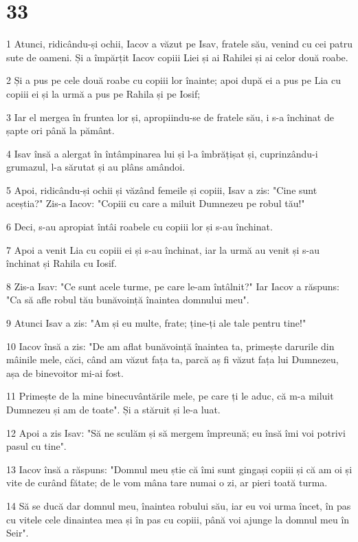 \chapter{33}

\par 1 Atunci, ridicându-și ochii, Iacov a văzut pe Isav, fratele său, venind cu cei patru sute de oameni. Și a împărțit Iacov copiii Liei și ai Rahilei și ai celor două roabe.
\par 2 Și a pus pe cele două roabe cu copiii lor înainte; apoi după ei a pus pe Lia cu copiii ei și la urmă a pus pe Rahila și pe Iosif;
\par 3 Iar el mergea în fruntea lor și, apropiindu-se de fratele său, i s-a închinat de șapte ori până la pământ.
\par 4 Isav însă a alergat în întâmpinarea lui și l-a îmbrățișat și, cuprinzându-i grumazul, l-a sărutat și au plâns amândoi.
\par 5 Apoi, ridicându-și ochii și văzând femeile și copiii, Isav a zis: "Cine sunt aceștia?" Zis-a Iacov: "Copiii cu care a miluit Dumnezeu pe robul tău!"
\par 6 Deci, s-au apropiat întâi roabele cu copiii lor și s-au închinat.
\par 7 Apoi a venit Lia cu copiii ei și s-au închinat, iar la urmă au venit și s-au închinat și Rahila cu Iosif.
\par 8 Zis-a Isav: "Ce sunt acele turme, pe care le-am întâlnit?" Iar Iacov a răspuns: "Ca să afle robul tău bunăvoință înaintea domnului meu".
\par 9 Atunci Isav a zis: "Am și eu multe, frate; ține-ți ale tale pentru tine!"
\par 10 Iacov însă a zis: "De am aflat bunăvoință înaintea ta, primește darurile din mâinile mele, căci, când am văzut fața ta, parcă aș fi văzut fața lui Dumnezeu, așa de binevoitor mi-ai fost.
\par 11 Primește de la mine binecuvântările mele, pe care ți le aduc, că m-a miluit Dumnezeu și am de toate". Și a stăruit și le-a luat.
\par 12 Apoi a zis Isav: "Să ne sculăm și să mergem împreună; eu însă îmi voi potrivi pasul cu tine".
\par 13 Iacov însă a răspuns: "Domnul meu știe că îmi sunt gingași copiii și că am oi și vite de curând fătate; de le vom mâna tare numai o zi, ar pieri toată turma.
\par 14 Să se ducă dar domnul meu, înaintea robului său, iar eu voi urma încet, în pas cu vitele cele dinaintea mea și în pas cu copiii, până voi ajunge la domnul meu în Seir".
